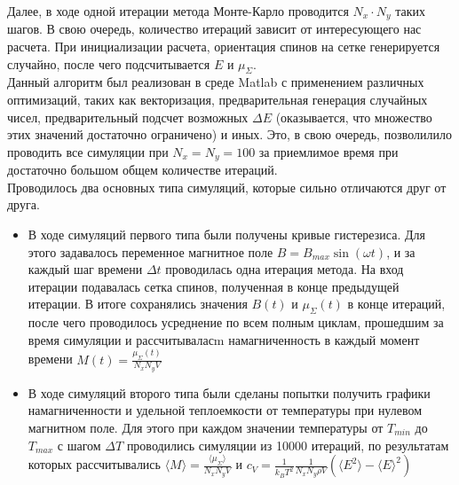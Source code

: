 \documentclass[oneside,final,14pt]{extarticle}
\begin{document}
	\noindent Далее, в ходе одной итерации метода Монте-Карло проводится $N_{x} \cdot N_{y}$ таких шагов. В свою очередь, количество итераций зависит от интересующего нас расчета. При инициализации расчета, ориентация спинов на сетке генерируется случайно, после чего подсчитывается $E$ и $\mu_{\Sigma}$. \\
	
	\noindent Данный алгоритм был реализован в среде Matlab с применением различных оптимизаций, таких как векторизация, предварительная генерация случайных чисел, предварительный подсчет возможных $\Delta E$ (оказывается, что множество этих значений достаточно ограничено) и иных. Это, в свою очередь, позволилило проводить все симуляции при $N_{x}=N_{y}=100$ за приемлимое время при достаточно большом общем количестве итераций. \\
	
	\noindent Проводилось два основных типа симуляций, которые сильно отличаются друг от друга.
	\begin{itemize}
		\item В ходе симуляций первого типа были получены кривые гистерезиса. Для этого задавалось переменное магнитное поле $B=B_{max}\sin(\omega t)$, и за каждый шаг времени $\Delta t$ проводилась одна итерация метода. На вход итерации подавалась сетка спинов, полученная в конце предыдущей итерации. В итоге сохранялись значения $B(t)$ и $\mu_{\Sigma}(t)$ в конце итераций, после чего проводилось усреднение по всем полным циклам, прошедшим за время симуляции и рассчитываласm намагниченность в каждый момент времени $M(t)=\frac{\mu_{\Sigma}(t)}{N_{x}N_{y}V}$
		\item В ходе симуляций второго типа были сделаны попытки получить графики намагниченности и удельной теплоемкости от температуры при нулевом магнитном поле. Для этого при каждом значении температуры от $T_{min}$ до $T_{max}$ с шагом $\Delta T$ проводились симуляции из 10000 итераций, по результатам которых рассчитывались $\langle M \rangle =\frac{\langle \mu_{\Sigma} \rangle}{N_{x}N_{y}V}$ и $c_{V}=\frac{1}{k_{B}T^2}\frac{1}{N_{x}N_{y}\rho V}(\langle E^2 \rangle - {\langle E \rangle}^2)$
	\end{itemize}
	
\end{document}
